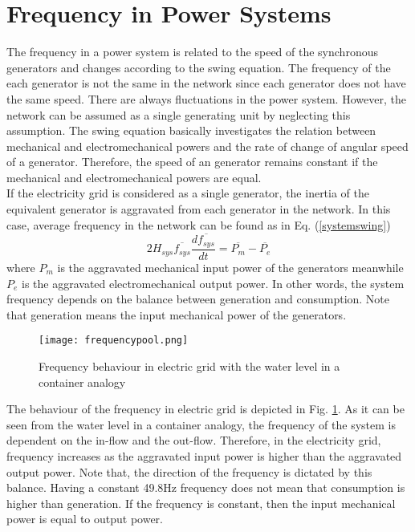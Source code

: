 \section{Frequency in Power Systems}
The frequency in a power system is related to the speed of the synchronous generators and changes according to the swing equation. The frequency of the each generator is not the same in the network since each generator does not have the same speed. There are always fluctuations in the power system. However, the network can be assumed as a single generating unit by neglecting this assumption. The swing equation basically investigates the relation between mechanical and electromechanical powers and the rate of change of angular speed of a generator. Therefore, the speed of an generator remains constant if the mechanical and electromechanical powers are equal.\\
If the electricity grid is considered as a single generator, the inertia of the equivalent generator is aggravated from each generator in the network. In this case, average frequency in the network can be found as in Eq. (\ref{systemswing})
\begin{equation}
\label{systemswing}
2H_{sys}\overline{f_{sys}}\frac{d\overline{f_{sys}}}{dt}=\overline{P_{m}}-\overline{P_{e}}
\end{equation}
where $P_{m}$ is the aggravated mechanical input power of the generators meanwhile $P_{e}$ is the aggravated electromechanical output power. In other words, the system frequency depends on the balance between generation and consumption. Note that generation means the input mechanical power of the generators.\par
\begin{figure}[h!]
	\centering
	\texttt{[image: frequencypool.png]}
	\caption{Frequency behaviour in electric grid with the water level in a container analogy \cite{Eto2010}}
	\label{frequencyingrid}
\end{figure}
The behaviour of the frequency in electric grid is depicted in Fig. \ref{frequencyingrid}. As it can be seen from the water level in a container analogy, the frequency of the system is dependent on the in-flow and the out-flow. Therefore, in the electricity grid, frequency increases as the aggravated input power is higher than the aggravated output power. Note that, the direction of the frequency is dictated by this balance. Having a constant 49.8Hz frequency does not mean that consumption is higher than generation. If the frequency is constant, then the input mechanical power is equal to output power.
